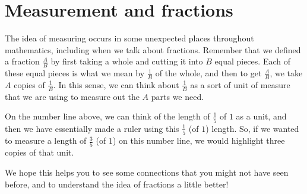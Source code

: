 \documentclass{ximera}
\begin{document}
\section{Measurement and fractions}
The idea of measuring occurs in some unexpected places throughout mathematics, including when we talk about fractions. Remember that we defined a fraction $\frac{A}{B}$ by first taking a whole and cutting it into $B$ equal pieces. Each of these equal pieces is what we mean by $\frac{1}{B}$ of the whole, and then to get $\frac{A}{B}$, we take $A$ copies of $\frac{1}{B}$. In this sense, we can think about $\frac{1}{B}$ as a sort of unit of measure that we are using to measure out the $A$ parts we need.
\begin{image}
\end{image}
On the number line above, we can think of the length of $\frac{1}{5}$ of $1$ as a unit, and then we have essentially made a ruler using this $\frac{1}{5}$ (of $1$) length. So, if we wanted to measure a length of $\frac{3}{5}$ (of $1$) on this number line, we would highlight three copies of that unit.

\begin{image}
\end{image}

We hope this helps you to see some connections that you might not have seen before, and to understand the idea of fractions a little better!
\end{document}
